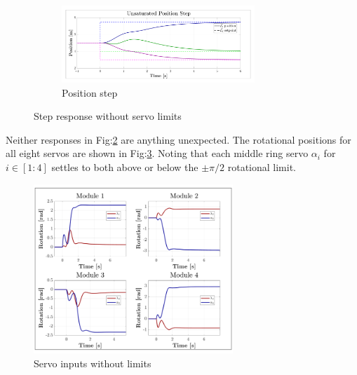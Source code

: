 \begin{figure}[htbp]
\vspace{-12pt}
\centering
\begin{subfigure}{\textwidth}
\centering
\includegraphics[width=0.8\textwidth]{graphs/unsaturated-position-step}
\vspace{-8pt}
\caption{Position step}
\label{fig:unsaturated-position-step}
\end{subfigure}
\vspace{-10pt}
\caption{Step response without servo limits}
\label{fig:unsaturated-step}
\vspace{-10pt}
\end{figure}
\par
Neither responses in Fig:\ref{fig:unsaturated-step} are anything unexpected. The rotational positions for all eight servos are shown in Fig:\ref{fig:unsaturated-servos}. Noting that each middle ring servo $\alpha_i$ for $i\in[1:4]$ settles to both above or below the $\pm\pi/2$ rotational limit.
\begin{figure}[hbtp]
\vspace{-12pt}
\centering
\includegraphics[width=0.67\textwidth]{graphs/unsaturated-servos}
\vspace{-12pt}
\caption{Servo inputs without limits}
\label{fig:unsaturated-servos}
\vspace{-20pt}
\end{figure}
